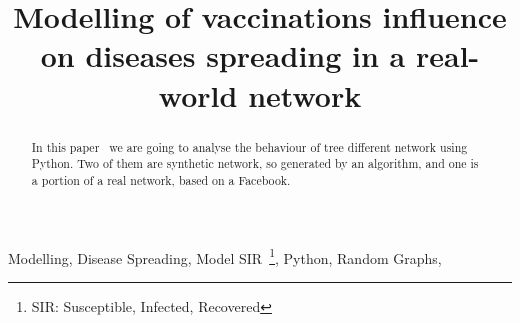 \documentclass[conference]{IEEEtran}
\begin{document}
\title{Modelling of vaccinations influence on diseases spreading in a real-world network\\
}

\author{
    \and
}

\maketitle

\begin{abstract}
In this paper~\cite{thisPaper} we are going to analyse the behaviour of tree different network using Python. Two of them are synthetic network, so generated by an algorithm, and one is a portion of a real network, based on a Facebook.
\end{abstract}

\begin{IEEEkeywords}
Modelling, Disease Spreading, Model SIR~\footnote{\label{fnote:SIR}SIR: Susceptible, Infected, Recovered}, Python, Random Graphs, 
\end{IEEEkeywords}









\end{document}
